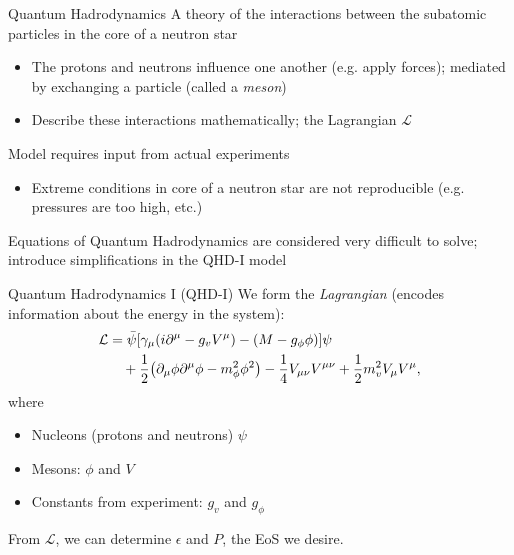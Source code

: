 \documentclass[]{beamer}
\newcommand{\Letter}[1]{\mathcal{#1}}
\newcommand{\Lag}{\Letter{L}}
\newcommand{\p}{\partial}
\begin{document}
    \begin{frame}{Quantum Hadrodynamics}
        \pause A theory of the interactions between the subatomic particles in the core of a neutron star
        \pause
        \begin{itemize}
            \item The protons and neutrons influence one another (e.g. apply forces); \pause mediated by exchanging a particle \pause (called a \textit{meson}) \pause
            \item Describe these interactions mathematically; \pause the Lagrangian $\Lag$ \pause
        \end{itemize}
        Model requires input from actual experiments \pause
        \begin{itemize}
            \item Extreme conditions in core of a neutron star are not reproducible \pause (e.g. pressures are too high, etc.) \pause
        \end{itemize}
        Equations of Quantum Hadrodynamics are considered very difficult to solve; \pause introduce simplifications in the QHD-I model
    \end{frame}

    \begin{frame}{Quantum Hadrodynamics I (QHD-I)}
        We form the \textit{Lagrangian} (encodes information about the energy in the system): \pause
        \begin{align*}
            \Lag & = \bar{\psi} \bqty{\gamma_\mu(i\p^\mu -g_v V^\mu) - (M-g_\phi\phi)} \psi \nonumber\\
            & \quad + \frac{1}{2} \pqty{\p_\mu \phi \p^\mu \phi - m_\phi^2 \phi^2} - \frac{1}{4} V_{\mu\nu}V^{\mu\nu} + \frac{1}{2} m_v^2 V_\mu V^\mu,
        \end{align*}\pause
        where
        \begin{itemize}
            \item Nucleons (protons and neutrons) $\psi$ \pause
            \item Mesons: $\phi$ and $V$ \pause
            \item Constants from experiment: $g_v$ and $g_\phi$ \pause
        \end{itemize}
        From $\Lag$, we can determine $\epsilon$ and $P$, the EoS we desire.
    \end{frame}
\end{document}
